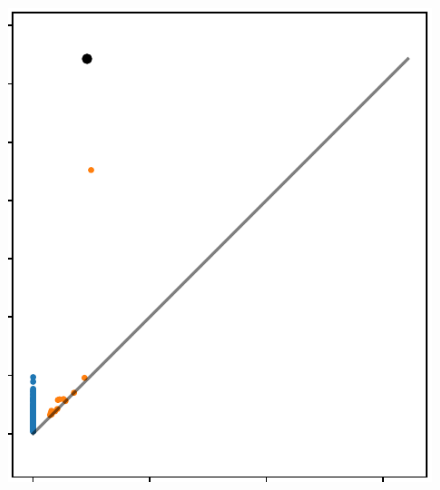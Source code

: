 \begin{figure}[htbp]
    \includegraphics[scale=0.66]{figures/circular_dgm1.pdf}
     \caption{}
     \label{fig:dgm1}
 \end{figure}

